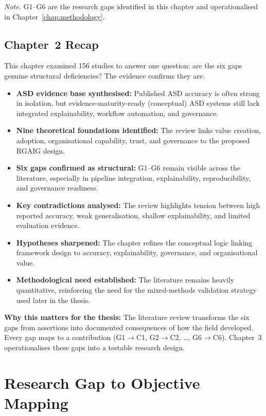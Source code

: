 \vspace{0.5em}\noindent\textit{Note.} G1--G6 are the research gaps identified in this chapter and operationalised in Chapter~\ref{chap:methodology}.

\subsection{Chapter~2 Recap}

This chapter examined 156 studies to answer one question: are the six gaps genuine structural deficiencies? The evidence confirms they are.

\begin{itemize}[leftmargin=*, itemsep=3pt]
  \item \textbf{ASD evidence base synthesised:} Published ASD accuracy is often strong in isolation, but evidence-maturity-ready (conceptual) ASD systems still lack integrated explainability, workflow automation, and governance.
  \item \textbf{Nine theoretical foundations identified:} The review links value creation, adoption, organisational capability, trust, and governance to the proposed RGAIG design.
  \item \textbf{Six gaps confirmed as structural:} G1--G6 remain visible across the literature, especially in pipeline integration, explainability, reproducibility, and governance readiness.
  \item \textbf{Key contradictions analysed:} The review highlights tension between high reported accuracy, weak generalisation, shallow explainability, and limited evaluation evidence.
  \item \textbf{Hypotheses sharpened:} The chapter refines the conceptual logic linking framework design to accuracy, explainability, governance, and organisational value.
  \item \textbf{Methodological need established:} The literature remains heavily quantitative, reinforcing the need for the mixed-methods validation strategy used later in the thesis.
\end{itemize}

\noindent\textbf{Why this matters for the thesis:} The literature review transforms the six gaps from assertions into documented consequences of how the field developed. Every gap maps to a contribution (G1$\to$C1, G2$\to$C2, \ldots, G6$\to$C6). Chapter~3 operationalises these gaps into a testable research design.


\section{Research Gap to Objective Mapping}

